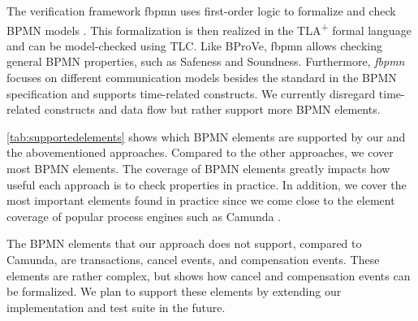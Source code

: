 \documentclass{lmcs} %
\begin{document}
The verification framework \textsf{fbpmn} uses first-order logic to formalize and check BPMN models \cite{houhouFirstOrderLogicVerification2022}.
This formalization is then realized in the TLA\textsuperscript{+} formal language and can be model-checked using TLC.
Like BProVe, \textsf{fbpmn} allows checking general BPMN properties, such as Safeness and Soundness.
Furthermore, \textit{fbpmn} focuses on different communication models besides the standard in the BPMN specification and supports time-related constructs.
We currently disregard time-related constructs \cite{duranVerifyingTimedBPMN2017,houhouFirstOrderLogicVerification2022} and data flow \cite{corradiniFormalisingAnimatingMultiple2022,el-saberCMMICMComplianceChecking2015} but rather support more BPMN elements.

\autoref{tab:supportedelements} shows which BPMN elements are supported by our and the abovementioned approaches.
Compared to the other approaches, we cover most BPMN elements.
The coverage of BPMN elements greatly impacts how useful each approach is to check properties in practice.
In addition, we cover the most important elements found in practice since we come close to the element coverage of popular process engines such as Camunda \cite{camundaservicesgmbhBPMNImplementationReference2023}.

The BPMN elements that our approach does not support, compared to Camunda, are transactions, cancel events, and compensation events.
These elements are rather complex, but \cite{vangorpVisualTokenbasedFormalization2013} shows how cancel and compensation events can be formalized.
We plan to support these elements by extending our implementation and test suite in the future.
\end{document}
